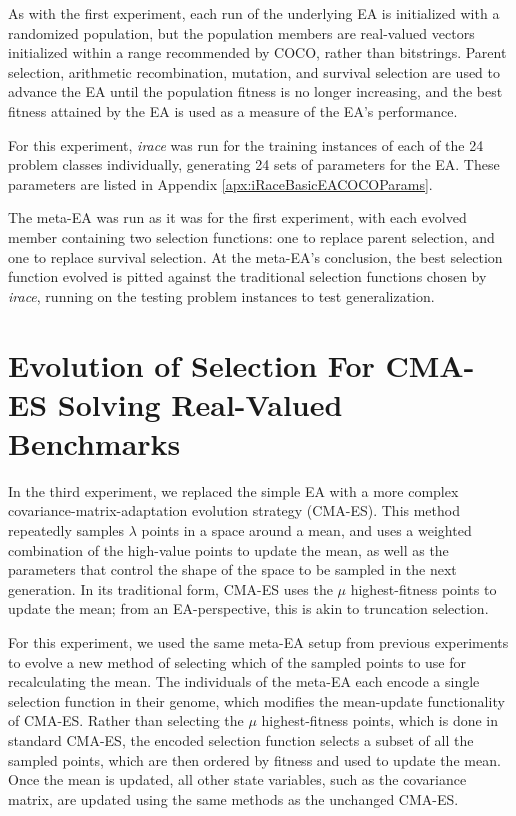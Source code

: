 \documentclass[times,12pt,titlepage]{mstogs}
\begin{document}
\begin{ThesisBody}
As with the first experiment, each run of the underlying EA is initialized with a randomized population, but the population members are real-valued vectors initialized within a range recommended by COCO, rather than bitstrings. Parent selection, arithmetic recombination, mutation, and survival selection are used to advance the EA until the population fitness is no longer increasing, and the best fitness attained by the EA is used as a measure of the EA's performance.

For this experiment, \textit{irace} was run for the training instances of each of the 24 problem classes individually, generating 24 sets of parameters for the EA. These parameters are listed in Appendix \ref{apx:iRaceBasicEACOCOParams}. 

The meta-EA was run as it was for the first experiment, with each evolved member containing two selection functions: one to replace parent selection, and one to replace survival selection. At the meta-EA's conclusion, the best selection function evolved is pitted against the traditional selection functions chosen by \textit{irace}, running on the testing problem instances to test generalization.

\section{Evolution of Selection For CMA-ES Solving Real-Valued Benchmarks}
\label{Evolution of Selection For CMA-ES Solving Real-Valued Benchmarks}

In the third experiment, we replaced the simple EA with a more complex covariance-matrix-adaptation evolution strategy (CMA-ES). This method repeatedly samples $\lambda$ points in a space around a mean, and uses a weighted combination of the high-value points to update the mean, as well as the parameters that control the shape of the space to be sampled in the next generation. In its traditional form, CMA-ES uses the $\mu$ highest-fitness points to update the mean; from an EA-perspective, this is akin to truncation selection. 

For this experiment, we used the same meta-EA setup from previous experiments to evolve a new method of selecting which of the sampled points to use for recalculating the mean. The individuals of the meta-EA each encode a single selection function in their genome, which modifies the mean-update functionality of CMA-ES. Rather than selecting the $\mu$ highest-fitness points, which is done in standard CMA-ES, the encoded selection function selects a subset of all the sampled points, which are then ordered by fitness and used to update the mean. Once the mean is updated, all other state variables, such as the covariance matrix, are updated using the same methods as the unchanged CMA-ES.


\end{ThesisBody}
\end{document}
